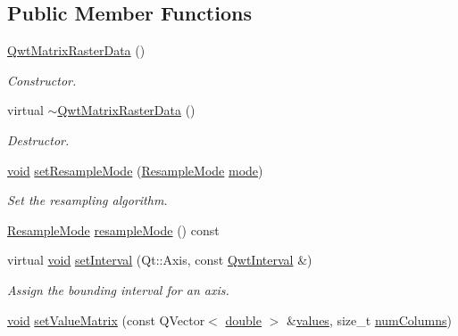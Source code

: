 \subsection*{Public Member Functions}
\begin{DoxyCompactItemize}
\item 
\hyperlink{class_qwt_matrix_raster_data_a3e80514459cc6aab03cfd839da53e45e}{Qwt\-Matrix\-Raster\-Data} ()
\begin{DoxyCompactList}\small\item\em Constructor. \end{DoxyCompactList}\item 
virtual \hyperlink{class_qwt_matrix_raster_data_a15284284966f25383fe67f2e278f4869}{$\sim$\-Qwt\-Matrix\-Raster\-Data} ()
\begin{DoxyCompactList}\small\item\em Destructor. \end{DoxyCompactList}\item 
\hyperlink{group___u_a_v_objects_plugin_ga444cf2ff3f0ecbe028adce838d373f5c}{void} \hyperlink{class_qwt_matrix_raster_data_a038effe6e4be13725b7a8d35370595fd}{set\-Resample\-Mode} (\hyperlink{class_qwt_matrix_raster_data_a3c8def5d9ae452bd82e6c4b71b480209}{Resample\-Mode} \hyperlink{glext_8h_a1e71d9c196e4683cc06c4b54d53f7ef5}{mode})
\begin{DoxyCompactList}\small\item\em Set the resampling algorithm. \end{DoxyCompactList}\item 
\hyperlink{class_qwt_matrix_raster_data_a3c8def5d9ae452bd82e6c4b71b480209}{Resample\-Mode} \hyperlink{class_qwt_matrix_raster_data_af4edef83d2862640893552b8f20ed725}{resample\-Mode} () const 
\item 
virtual \hyperlink{group___u_a_v_objects_plugin_ga444cf2ff3f0ecbe028adce838d373f5c}{void} \hyperlink{class_qwt_matrix_raster_data_a69db38d8f920edb9dc3f0953ca16db8f}{set\-Interval} (Qt\-::\-Axis, const \hyperlink{class_qwt_interval}{Qwt\-Interval} \&)
\begin{DoxyCompactList}\small\item\em Assign the bounding interval for an axis. \end{DoxyCompactList}\item 
\hyperlink{group___u_a_v_objects_plugin_ga444cf2ff3f0ecbe028adce838d373f5c}{void} \hyperlink{class_qwt_matrix_raster_data_a9520b89815edd800e65cd13ebd4677a3}{set\-Value\-Matrix} (const Q\-Vector$<$ \hyperlink{_super_l_u_support_8h_a8956b2b9f49bf918deed98379d159ca7}{double} $>$ \&\hyperlink{glext_8h_a300a8ed5fb9490aa35713406ec0412df}{values}, size\-\_\-t \hyperlink{class_qwt_matrix_raster_data_ab9554c0c132f8a5a7ce6bc2baea37b14}{num\-Columns})

\end{DoxyCompactItemize}
